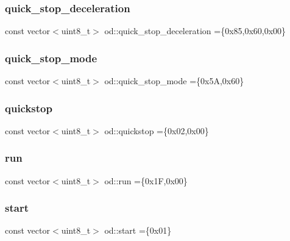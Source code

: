 \mbox{\label{namespaceod_a57361a1a6b60fd8b93c2828fd7f5429f}} 
\subsubsection{\texorpdfstring{quick\+\_\+stop\+\_\+deceleration}{quick\_stop\_deceleration}}
{\footnotesize\ttfamily const vector$<$uint8\+\_\+t$>$ od\+::quick\+\_\+stop\+\_\+deceleration =\{0x85,0x60,0x00\}}

\mbox{\label{namespaceod_ab5b4d34058d08a758277bf52cd31d8c9}} 
\subsubsection{\texorpdfstring{quick\+\_\+stop\+\_\+mode}{quick\_stop\_mode}}
{\footnotesize\ttfamily const vector$<$uint8\+\_\+t$>$ od\+::quick\+\_\+stop\+\_\+mode =\{0x5\+A,0x60\}}

\mbox{\label{namespaceod_a9afdc654634df7cc336d824c594d484a}} 
\subsubsection{\texorpdfstring{quickstop}{quickstop}}
{\footnotesize\ttfamily const vector$<$uint8\+\_\+t$>$ od\+::quickstop =\{0x02,0x00\}}

\mbox{\label{namespaceod_af47128107b86d08e437f81d48d20b05a}} 
\subsubsection{\texorpdfstring{run}{run}}
{\footnotesize\ttfamily const vector$<$uint8\+\_\+t$>$ od\+::run =\{0x1\+F,0x00\}}

\mbox{\label{namespaceod_a5ca62a6451017dd2a0d53391d6fc5161}} 
\subsubsection{\texorpdfstring{start}{start}}
{\footnotesize\ttfamily const vector$<$uint8\+\_\+t$>$ od\+::start =\{0x01\}}

